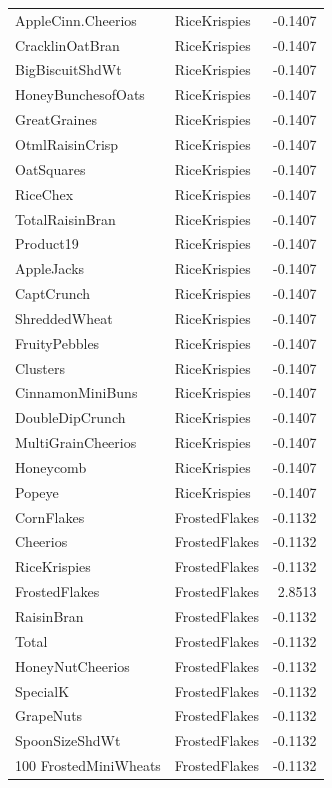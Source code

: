 \begin{longtable}{llr}
AppleCinn.Cheerios & RiceKrispies & -0.1407 \\
CracklinOatBran & RiceKrispies & -0.1407 \\
BigBiscuitShdWt & RiceKrispies & -0.1407 \\
HoneyBunchesofOats & RiceKrispies & -0.1407 \\
GreatGraines & RiceKrispies & -0.1407 \\
OtmlRaisinCrisp & RiceKrispies & -0.1407 \\
OatSquares & RiceKrispies & -0.1407 \\
RiceChex & RiceKrispies & -0.1407 \\
TotalRaisinBran & RiceKrispies & -0.1407 \\
Product19 & RiceKrispies & -0.1407 \\
AppleJacks & RiceKrispies & -0.1407 \\
CaptCrunch & RiceKrispies & -0.1407 \\
ShreddedWheat & RiceKrispies & -0.1407 \\
FruityPebbles & RiceKrispies & -0.1407 \\
Clusters & RiceKrispies & -0.1407 \\
CinnamonMiniBuns & RiceKrispies & -0.1407 \\
DoubleDipCrunch & RiceKrispies & -0.1407 \\
MultiGrainCheerios & RiceKrispies & -0.1407 \\
Honeycomb & RiceKrispies & -0.1407 \\
Popeye & RiceKrispies & -0.1407 \\
CornFlakes & FrostedFlakes & -0.1132 \\
Cheerios & FrostedFlakes & -0.1132 \\
RiceKrispies & FrostedFlakes & -0.1132 \\
FrostedFlakes & FrostedFlakes & 2.8513 \\
RaisinBran & FrostedFlakes & -0.1132 \\
Total & FrostedFlakes & -0.1132 \\
HoneyNutCheerios & FrostedFlakes & -0.1132 \\
SpecialK & FrostedFlakes & -0.1132 \\
GrapeNuts & FrostedFlakes & -0.1132 \\
SpoonSizeShdWt & FrostedFlakes & -0.1132 \\
100%
FrostedMiniWheats & FrostedFlakes & -0.1132 \\

\end{longtable}
